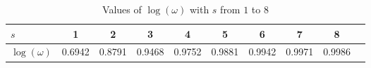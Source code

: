 \begin{table}[htbp]
    \centering
    \begin{tabular}{||m{0.95cm}||c|c|c|c|c|c|c|c|c|}
        \hline
        $s$ & 1 & 2 & 3 & 4 & 5 & 6 & 7 & 8 \\
        \hline
        $\log(\omega)$ & 0.6942 & 0.8791 & 0.9468 &	0.9752 & 0.9881 & 0.9942 & 0.9971 & 0.9986 \\
        \hline
    \end{tabular}
    \caption{Values of $\log(\omega)$ with $s$ from $1$ to $8$}
    \label{tab:log_omega}
\end{table}